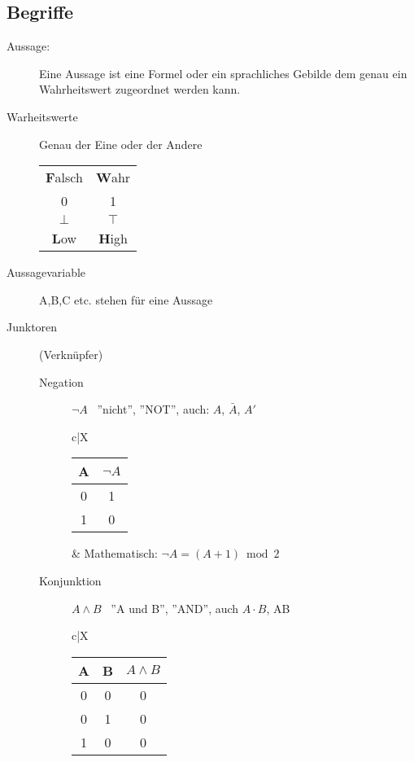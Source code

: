 \subsection{Begriffe}
\begin{description}
    \item[Aussage:] Eine Aussage ist eine Formel oder ein sprachliches Gebilde dem genau ein Wahrheitswert zugeordnet werden kann.

    \item[Warheitswerte] Genau der Eine oder der Andere \\
    \begin{tabular}{c|c}
        \textbf{F}alsch & \textbf{W}ahr \\
        0               & 1             \\
        $\bot$          & $\top$        \\
        \textbf{L}ow    & \textbf{H}igh
    \end{tabular}
    \item[Aussagevariable] A,B,C etc. stehen für eine Aussage
    \item[Junktoren] (Verknüpfer)
    \begin{description}
        \item[Negation] $\neg A$ \, ''nicht'', ''NOT'', auch: $A$, $\bar{A}$, $A'$ \\
        \begin{tabularx}{\linewidth}{c|X}
            \begin{tabular}[t]{c|c}
                A & $\neg A$ \\ \hline
                0 & 1        \\
                1 & 0
            \end{tabular} &
            Mathematisch: $\neg A = (A + 1) \bmod 2$ \\ \hline
        \end{tabularx}
        \item[Konjunktion] $A\wedge B$ \, ''A und B'', ''AND'', auch $A\cdot B$, AB \\
        \begin{tabularx}{\linewidth}{c|X}
            \begin{tabular}[t]{c|c||c}
                A & B & $A \wedge B$ \\ \hline\hline
                0 & 0 & 0            \\ \hline
                0 & 1 & 0            \\ \hline
                1 & 0 & 0            \\ \hline

\end{tabular}
\end{tabularx}
\end{description}
\end{description}
